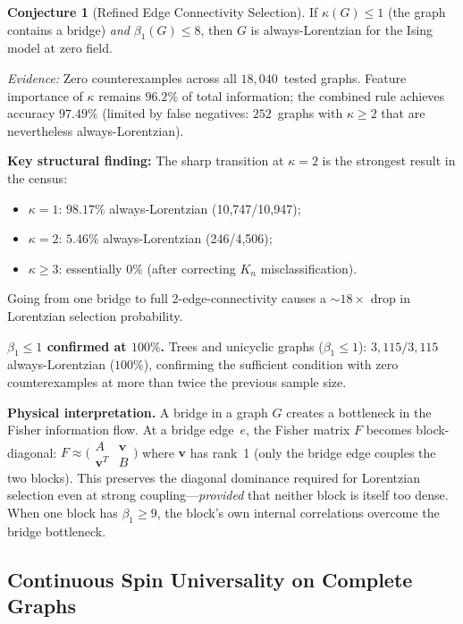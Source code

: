 \documentclass[11pt]{article}
\theoremstyle{definition}
\newtheorem{conjecture}[theorem]{Conjecture}
\theoremstyle{remark}
\begin{document}
\begin{conjecture}[Refined Edge Connectivity Selection]
\label{conj:edge-conn-refined}
If $\kappa(G) \leq 1$ (the graph contains a bridge) \emph{and} $\beta_1(G) \leq 8$,
then $G$ is always-Lorentzian for the Ising model at zero field.
\end{conjecture}

\noindent\emph{Evidence:} Zero counterexamples across all $18{,}040$~tested
graphs. Feature importance of $\kappa$ remains $96.2\%$ of total information; the
combined rule achieves accuracy $97.49\%$ (limited by false negatives:
$252$~graphs with $\kappa \geq 2$ that are nevertheless always-Lorentzian).

\noindent\textbf{Key structural finding:}
The sharp transition at $\kappa = 2$ is the strongest result in the census:
\begin{itemize}
\item $\kappa = 1$: $98.17\%$ always-Lorentzian (10,747/10,947);
\item $\kappa = 2$: $5.46\%$ always-Lorentzian (246/4,506);
\item $\kappa \geq 3$: essentially $0\%$ (after correcting $K_n$ misclassification).
\end{itemize}
Going from one bridge to full 2-edge-connectivity causes a ${\sim}18\times$ drop
in Lorentzian selection probability.

\noindent\textbf{$\beta_1 \leq 1$ confirmed at $100\%$.}
Trees and unicyclic graphs ($\beta_1 \leq 1$): $3{,}115/3{,}115$ always-Lorentzian
($100\%$), confirming the sufficient condition with zero counterexamples at
more than twice the previous sample size.

\noindent\textbf{Physical interpretation.}
A bridge in a graph $G$ creates a bottleneck in the Fisher information flow.
At a bridge edge~$e$, the Fisher matrix $F$ becomes block-diagonal:
$F \approx \bigl(\begin{smallmatrix} A & \mathbf{v} \\ \mathbf{v}^T & B
\end{smallmatrix}\bigr)$ where $\mathbf{v}$ has rank~1 (only the bridge
edge couples the two blocks). This preserves the diagonal dominance
required for Lorentzian selection even at strong coupling---\emph{provided}
that neither block is itself too dense. When one block has $\beta_1 \geq 9$,
the block's own internal correlations overcome the bridge bottleneck.

\subsection{Continuous Spin Universality on Complete Graphs}
\label{sec:continuous-kn}
\end{document}
